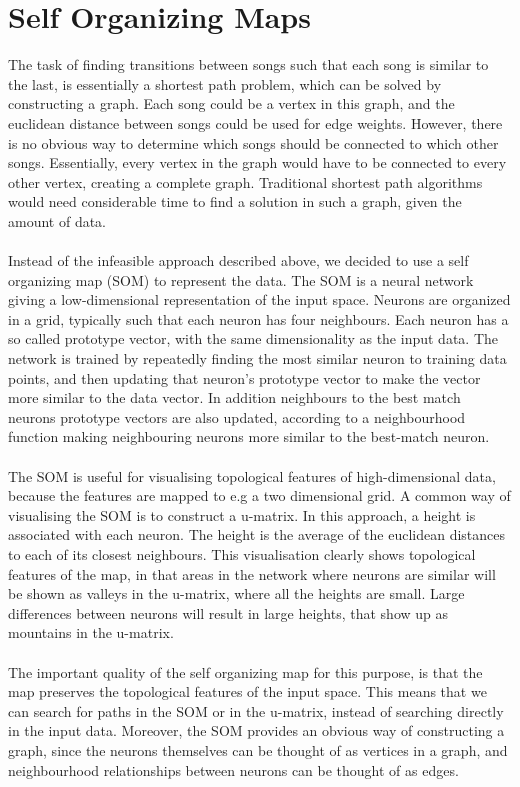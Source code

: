\section{Self Organizing Maps} %
\label{sec:self_organizing_maps}
The task of finding transitions between songs such that each song is similar to the last, is essentially a shortest path problem, which can be solved by constructing a graph. Each song could be a vertex in this graph, and the euclidean distance between songs could be used for edge weights. However, there is no obvious way to determine which songs should be connected to which other songs. Essentially, every vertex in the graph would have to be connected to every other vertex, creating a complete graph. Traditional shortest path algorithms would need considerable time to find a solution in such a graph, given the amount of data.
\\\\
Instead of the infeasible approach described above, we decided to use a self organizing map (SOM) to represent the data. The SOM is a neural network giving a low-dimensional representation of the input space. Neurons are organized in a grid, typically such that each neuron has four neighbours. Each neuron has a so called prototype vector, with the same dimensionality as the input data. The network is trained by repeatedly finding the most similar neuron to training data points, and then updating that neuron's prototype vector to make the vector more similar to the data vector. In addition neighbours to the best match neurons prototype vectors are also updated, according to a neighbourhood function making neighbouring neurons more similar to the best-match neuron.
\\\\
The SOM is useful for visualising topological features of high-dimensional data, because the features are mapped to e.g a two dimensional grid. A common way of visualising the SOM is to construct a u-matrix. In this approach, a height is associated with each neuron. The height is the average of the euclidean distances to each of its closest neighbours. This visualisation clearly shows topological features of the map, in that areas in the network where neurons are similar will be shown as valleys in the u-matrix, where all the heights are small. Large differences between neurons will result in large heights, that show up as mountains in the u-matrix.
\\\\
The important quality of the self organizing map for this purpose, is that the map preserves the topological features of the input space. This means that we can search for paths in the SOM or in the u-matrix, instead of searching directly in the input data. Moreover, the SOM provides an obvious way of constructing a graph, since the neurons themselves can be thought of as vertices in a graph, and neighbourhood relationships between neurons can be thought of as edges.

